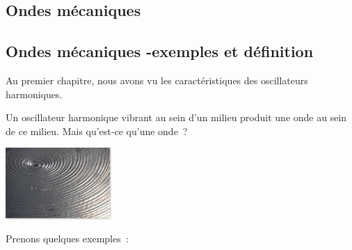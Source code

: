 \begin{multicols}{2}

\section{Ondes mécaniques}

\subsection{Ondes mécaniques -exemples et définition }

Au premier chapitre, nous avons vu les caractéristiques des oscillateurs
harmoniques.

Un oscillateur harmonique vibrant au sein d'un milieu produit une onde
au sein de ce milieu. Mais qu'est-ce qu'une onde~?

\includegraphics[width=4.032cm,height=2.711cm]{Pictures/1000000100000110000000B7020F4AB269606603.png}

Prenons quelques exemples~:


\end{multicols}
